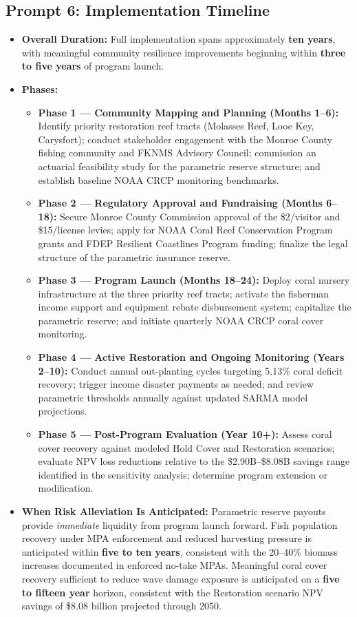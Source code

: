 \documentclass[10pt,letterpaper]{article}
\newcounter{gs}
\begin{document}
\subsection*{Prompt 6: Implementation Timeline}
\begin{itemize}
    \item \textbf{Overall Duration:} Full implementation spans approximately \textbf{ten years}, with meaningful community resilience improvements beginning within \textbf{three to five years} of program launch.
    \item \textbf{Phases:}
    \begin{itemize}
        \item \textbf{Phase 1 --- Community Mapping and Planning (Months 1--6):} Identify priority restoration reef tracts (Molasses Reef, Looe Key, Carysfort); conduct stakeholder engagement with the Monroe County fishing community and FKNMS Advisory Council; commission an actuarial feasibility study for the parametric reserve structure; and establish baseline NOAA CRCP monitoring benchmarks.
        \item \textbf{Phase 2 --- Regulatory Approval and Fundraising (Months 6--18):} Secure Monroe County Commission approval of the \$2/visitor and \$15/license levies; apply for NOAA Coral Reef Conservation Program grants and FDEP Resilient Coastlines Program funding; finalize the legal structure of the parametric insurance reserve.
        \item \textbf{Phase 3 --- Program Launch (Months 18--24):} Deploy coral nursery infrastructure at the three priority reef tracts; activate the fisherman income support and equipment rebate disbursement system; capitalize the parametric reserve; and initiate quarterly NOAA CRCP coral cover monitoring.
        \item \textbf{Phase 4 --- Active Restoration and Ongoing Monitoring (Years 2--10):} Conduct annual out-planting cycles targeting 5.13\% coral deficit recovery; trigger income disaster payments as needed; and review parametric thresholds annually against updated SARMA model projections.
        \item \textbf{Phase 5 --- Post-Program Evaluation (Year 10+):} Assess coral cover recovery against modeled Hold Cover and Restoration scenarios; evaluate NPV loss reductions relative to the \$2.90B--\$8.08B savings range identified in the sensitivity analysis; determine program extension or modification.
    \end{itemize}
    \item \textbf{When Risk Alleviation Is Anticipated:} Parametric reserve payouts provide \textit{immediate} liquidity from program launch forward. Fish population recovery under MPA enforcement and reduced harvesting pressure is anticipated within \textbf{five to ten years}, consistent with the 20--40\% biomass increases documented in enforced no-take MPAs. Meaningful coral cover recovery sufficient to reduce wave damage exposure is anticipated on a \textbf{five to fifteen year} horizon, consistent with the Restoration scenario NPV savings of \$8.08 billion projected through 2050.
\end{itemize}
\end{document}
